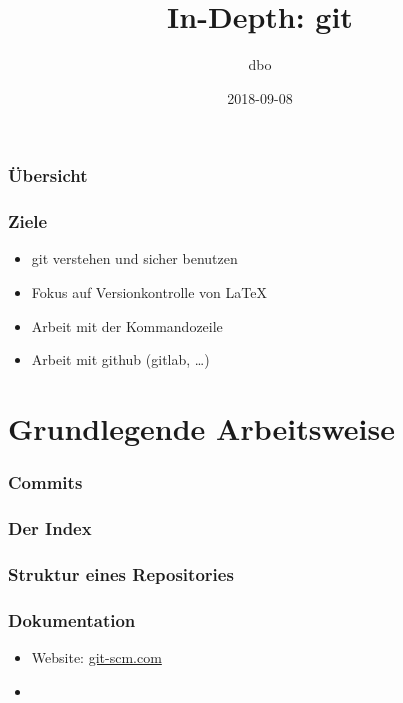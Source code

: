 \documentclass{cms-kurs}
\title{In-Depth: git}
\author{dbo}
\date{2018-09-08}
\begin{document}
\begin{frame}
  \frametitle{Übersicht}
  \tableofcontents{}
\end{frame}

\begin{frame}
  \frametitle{Ziele}

  \onslide<+->

  \begin{itemize}
  \item git verstehen und sicher benutzen
  \item Fokus auf Versionkontrolle von \LaTeX{}
  \item Arbeit mit der Kommandozeile
  \item Arbeit mit github (gitlab, …)
  \end{itemize}

\end{frame}

\section{Grundlegende Arbeitsweise}

\begin{frame}
  \frametitle{Commits}

  \onslide<+->



\end{frame}

\begin{frame}
  \frametitle{Der Index}

  \onslide<+->


\end{frame}

\begin{frame}
  \frametitle{Struktur eines Repositories}

  \onslide<+->


\end{frame}

\begin{frame}
  \frametitle{Dokumentation}

  \onslide<+->

  \begin{itemize}
  \item Website: \url{git-scm.com}
  \item {}
  \end{itemize}

\end{frame}
\end{document}
